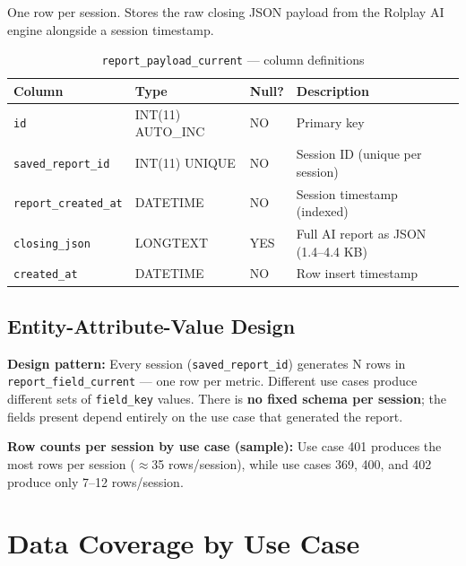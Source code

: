 \documentclass[12pt,a4paper]{article}
\begin{document}
One row per session.  Stores the raw closing JSON payload from the Rolplay AI
engine alongside a session timestamp.

\begin{table}[H]
\centering\small
\begin{tabular}{L{3.8cm} L{3.2cm} C{1.6cm} L{5.6cm}}
\toprule
\textbf{Column} & \textbf{Type} & \textbf{Null?} & \textbf{Description} \\
\midrule
\texttt{id}                  & INT(11) AUTO\_INC  & NO  & Primary key \\
\texttt{saved\_report\_id}   & INT(11) UNIQUE     & NO  & Session ID (unique per session) \\
\texttt{report\_created\_at} & DATETIME           & NO  & Session timestamp (indexed) \\
\texttt{closing\_json}       & LONGTEXT           & YES & Full AI report as JSON (1.4--4.4 KB) \\
\texttt{created\_at}         & DATETIME           & NO  & Row insert timestamp \\
\bottomrule
\end{tabular}
\caption{\texttt{report\_payload\_current} --- column definitions}
\end{table}

\subsection{Entity-Attribute-Value Design}

\begin{infobox}
\textbf{Design pattern:} Every session (\texttt{saved\_report\_id}) generates
N rows in \texttt{report\_field\_current} --- one row per metric.  Different
use cases produce different sets of \texttt{field\_key} values.  There is
\textbf{no fixed schema per session}; the fields present depend entirely on
the use case that generated the report.
\end{infobox}

\textbf{Row counts per session by use case (sample):}
Use case 401 produces the most rows per session ($\approx$35 rows/session),
while use cases 369, 400, and 402 produce only 7--12 rows/session.

\section{Data Coverage by Use Case}
\end{document}
